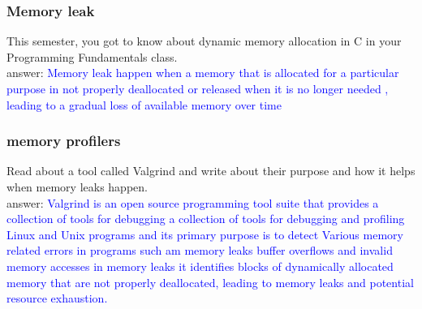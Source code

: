 \documentclass[titlepage]{article}
\begin{document}
\subsubsection{Memory leak}
This semester, you got to know about dynamic memory allocation in C in your Programming Fundamentals class.\\ answer: 
\textcolor{blue}{Memory leak happen when a memory that is allocated for a particular purpose in not properly deallocated or released when it is no longer needed , leading to a gradual loss of available memory over time}
\subsubsection{memory profilers}
Read about a tool called Valgrind and write about their purpose and how it helps when
memory leaks happen.
\\answer: \textcolor{blue}{Valgrind is an open source programming tool suite that provides a collection of tools for debugging a collection of tools for debugging and profiling Linux and Unix programs and its primary purpose is to detect Various memory related errors in programs such am memory leaks buffer overflows and invalid memory accesses in memory leaks it identifies blocks of dynamically allocated memory that are not properly deallocated, leading to memory leaks and potential resource exhaustion.}
\end{document}
